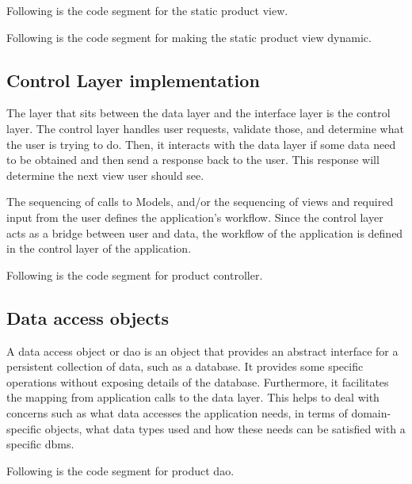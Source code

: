 \documentclass[12pt]{report}
\begin{document}
\noindent
Following is the code segment for the static product view.



\noindent
Following is the code segment for making the static product view dynamic.



\subsection{Control Layer implementation}
The layer that sits between the data layer and the interface layer is the control layer. The control layer handles user requests, validate those, and determine what the user is trying to do. Then, it interacts with the data layer if some data need to be obtained and then send a response back to the user. This response will determine the next view user should see.

The sequencing of calls to Models, and/or the sequencing of views and required input from the user defines the application's workflow. Since the control layer acts as a bridge between user and data, the workflow of the application is defined in the control layer of the application.

\noindent
Following is the code segment for product controller.



\subsection{Data access objects}
A data access object or \acrshort{dao} is an object that provides an abstract interface for a persistent collection of data, such as a database. It provides some specific operations without exposing details of the database. Furthermore, it facilitates the mapping from application calls to the data layer. This helps to deal with concerns such as what data accesses the application needs, in terms of domain-specific objects, what data types used and how these needs can be satisfied with a specific \acrshort{dbms}.

\noindent
Following is the code segment for product dao.


\end{document}
